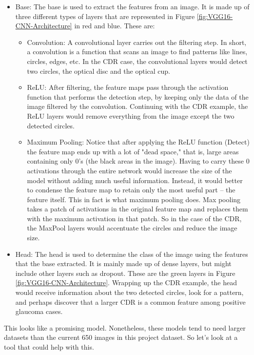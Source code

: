 \documentclass[11pt, a4paper]{article}
\begin{document}
\begin{itemize}
    \item Base: The base is used to extract the features from an image. It is made up of three different types of layers that are represented in Figure \ref{fig:VGG16-CNN-Architecture} in red and blue. These are:
    \begin{itemize}
        \item Convolution: A convolutional layer carries out the filtering step. In short, a convolution is a function that scans an image to find patterns like lines, circles, edges, etc. In the CDR case, the convolutional layers would detect two circles, the optical disc and the optical cup.
        \item ReLU: After filtering, the feature maps pass through the activation function that performs the detection step, by keeping only the data of the image filtered by the convolution. Continuing with the CDR example, the ReLU layers would remove everything from the image except the two detected circles.
        \item Maximum Pooling: Notice that after applying the ReLU function (Detect) the feature map ends up with a lot of "dead space," that is, large areas containing only 0's (the black areas in the image). Having to carry these 0 activations through the entire network would increase the size of the model without adding much useful information. Instead, it would better to condense the feature map to retain only the most useful part -- the feature itself. This in fact is what maximum pooling does. Max pooling takes a patch of activations in the original feature map and replaces them with the maximum activation in that patch. So in the case of the CDR, the MaxPool layers would accentuate the circles and reduce the image size.
    \end{itemize}
    \item Head: The head is used to determine the class of the image using the features that the base extracted. It is mainly made up of dense layers, but might include other layers such as dropout. These are the green layers in Figure \ref{fig:VGG16-CNN-Architecture}. Wrapping up the CDR example, the head would receive information about the two detected circles, look for a pattern, and perhaps discover that a larger CDR is a common feature among positive glaucoma cases.
\end{itemize}
This looks like a promising model. Nonetheless, these models tend to need larger datasets than the current 650 images in this project dataset. So let's look at a tool that could help with this.
\end{document}
